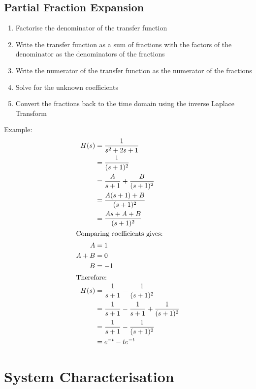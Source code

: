 \documentclass[oneside]{book}
\begin{document}
            \section{Partial Fraction Expansion}
                \begin{enumerate}
                    \item Factorise the denominator of the transfer function
                    \item Write the transfer function as a sum of fractions with the factors of the denominator as the denominators of the fractions
                    \item Write the numerator of the transfer function as the numerator of the fractions
                    \item Solve for the unknown coefficients
                    \item Convert the fractions back to the time domain using the inverse Laplace Transform
                \end{enumerate}
                Example:
                \begin{align*}
                    H(s) &= \frac{1}{s^2 + 2s + 1}\\
                    &= \frac{1}{(s+1)^2}\\
                    &= \frac{A}{s+1} + \frac{B}{(s+1)^2}\\
                    &= \frac{A(s+1) + B}{(s+1)^2}\\
                    &= \frac{As + A + B}{(s+1)^2}\\
                    \intertext{Comparing coefficients gives:}
                    A &= 1\\
                    A + B &= 0\\
                    B &= -1\\
                    \intertext{Therefore:}
                    H(s) &= \frac{1}{s+1} - \frac{1}{(s+1)^2}\\
                    &= \frac{1}{s+1} - \frac{1}{s+1} + \frac{1}{(s+1)^2}\\
                    &= \frac{1}{s+1} - \frac{1}{(s+1)^2}\\
                    &= e^{-t} - te^{-t}
                \end{align*}
    \chapter{System Characterisation}
\end{document}
